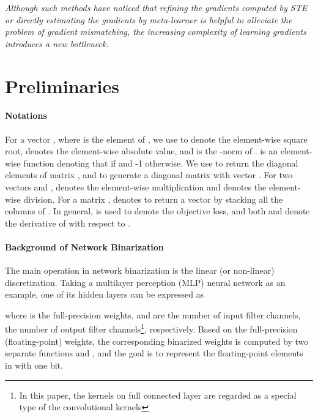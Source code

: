 \documentclass[runningheads]{llncs}
\begin{document}
\emph{Although such methods have noticed that refining the gradients computed by STE
or directly estimating the gradients by meta-learner is helpful to alleviate the problem of gradient mismatching,
the increasing complexity of learning gradients introduces a new bottleneck.}

\section{Preliminaries}
\paragraph{\textbf{Notations}}
For a vector , where  is the element of ,
we use  to denote the element-wise square root,
 denotes the element-wise absolute value,
and  is the -norm of .
 is an element-wise function denoting that
 if  and -1 otherwise.
We use  to return the diagonal elements of matrix ,
and  to generate a diagonal matrix with vector .
For two vectors  and ,
 denotes the element-wise multiplication
and  denotes the element-wise division.
For a matrix ,  denotes to return a vector by stacking all the columns of .
In general,  is used to denote the objective loss,
and both  and  denote
the derivative of  with respect to .

\paragraph{\textbf{Background of Network Binarization}}
The main operation in network binarization is the linear (or non-linear) discretization.
Taking a multilayer perception (MLP) neural network as an example, one of its hidden layers can be expressed as



where  is the full-precision weights,
and  are the number of input filter channels, the number of output filter channels\footnote{In this paper,
the kernels on full connected layer are regarded as a special type of the convolutional kernels}, respectively.
Based on the full-precision (floating-point) weights, the corresponding binarized weights 
is computed by two separate functions  and ,
and the goal is to represent the floating-point elements in  with one bit.
\end{document}
